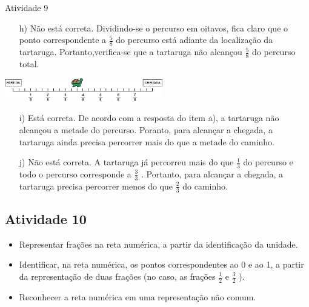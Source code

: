 \begin{multicols}{2}
\begin{resposta*}{Atividade 9}
\begin{enumerate} [\quad a)] %

\item[h)]     Não está correta. Dividindo-se o percurso em oitavos, fica claro que o ponto correspondente a     $\frac{5}{8}$     do percurso está adiante da localização da tartaruga. Portanto,verifica-se que a tartaruga não alcançou     $\frac{5}{8}$     do percurso total.          
\end{enumerate}

 \includegraphics[width=195pt, keepaspectratio]{..//media/cap3/secoes/png/ativ9_resp_h}

\begin{enumerate} [\quad a)] %

  \item[i)]     Está correta. De acordo com a resposta do item a), a tartaruga não alcançou a metade do percurso. Poranto, para alcançar a chegada, a tartaruga ainda precisa percorrer mais do que a metade do caminho.
  \item[j)]     Não está correta. A tartaruga já percorreu mais do que      $\frac{1}{3}$     do percurso e todo o percurso corresponde a      $\frac{3}{3}$    . Portanto, para alcançar a chegada, a tartaruga precisa percorrer menos do que     $\frac{2}{3}$     do caminho.
\end{enumerate} %
\end{resposta*}

\subsection{Atividade 10}

\begin{itemize} %
    \item       Representar frações na reta numérica, a partir da identificação da unidade.
    \item       Identificar, na reta numérica, os pontos correspondentes ao 0 e ao 1, a partir da representação de duas frações (no caso, as frações       $\frac{1}{2}$       e       $\frac{3}{2}$      ).
    \item       Reconhecer a reta numérica em uma representação não comum.
\end{itemize} %
      

\end{multicols}
